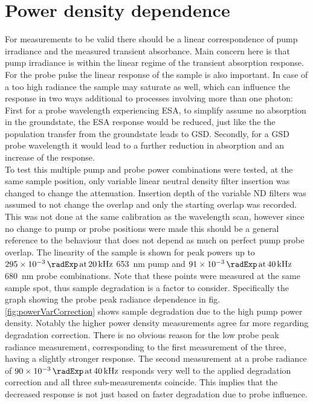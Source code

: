 \documentclass[twoside,openright]{scrreprt}
\def\pumpExp#1{\ensuremath{\SI{#1}{\radExp}\,\mathrm{at}\, \SI{20}{\kilo\hertz}}}
\def\probeExp#1{\ensuremath{\SI{#1}{\radExp}\,\mathrm{at}\, \SI{40}{\kilo\hertz}}}
\begin{document}
\section{Power density dependence}\label{sec:powerVar}
For measurements to be valid there should be a linear correspondence of pump irradiance and the measured transient absorbance. Main concern here is that pump irradiance is within the linear regime of the transient absorption response. For the probe pulse the linear response of the sample is also important. In case of a too high radiance the sample may saturate as well, which can influence the response in two ways additional to processes involving more than one photon: First for a probe wavelength experiencing ESA, to simplify assume no absorption in the groundstate, the ESA response would be reduced, just like the the population transfer from the groundstate leads to GSD. Secondly, for a GSD probe wavelength it would lead to a further reduction in absorption  and an increase of the response.\\
To test this multiple pump and probe power combinations were tested, at the same sample position, only variable linear neutral density filter insertion was changed to change the attenuation. Insertion depth of the variable ND filters was assumed to not change the overlap and only the starting overlap was recorded. This was not done at the same calibration as the wavelength scan, however since no change to pump or probe positions were made this should be a general reference to the behaviour that does not depend as much on perfect pump probe overlap. The linearity of the sample is shown for peak powers up to \pumpExp{295e-3} \SI{653}{\nano\meter} pump and \probeExp{91e-3} \SI{680}{\nano\meter} probe combinations. Note that these points were measured at the same sample spot, thus sample degradation is a factor to consider. Specifically the graph showing the probe peak radiance dependence in fig. \ref{fig:powerVarCorrection} shows sample degradation due to the high pump power density. Notably the higher power density measurements agree far more regarding degradation correction. There is no obvious reason for the low probe peak radiance measurement, corresponding to the first measurement of the three, having a slightly stronger response. The second measurement at a probe radiance of \probeExp{90e-3} responds very well to the applied degradation correction and all three sub-measurements coincide. This implies that the decreased response is not just based on faster degradation due to probe influence.
\end{document}
